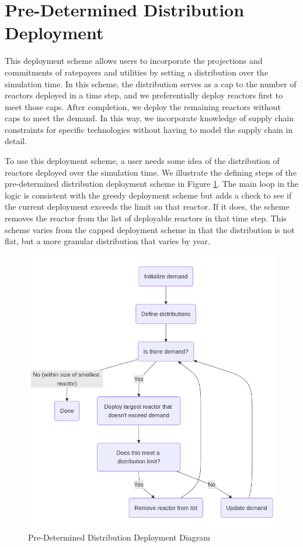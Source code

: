 \section{Pre-Determined Distribution Deployment}
\label{sec:pre_determined_distribution_deployment}
This deployment scheme allows users to incorporate the projections and
commitments of ratepayers and utilities by setting a distribution over the
simulation time. In this scheme, the distribution serves as a cap to the
number of reactors deployed in a time step, and we preferentially
deploy reactors first to meet those caps. After completion, we deploy the
remaining reactors without caps to meet the demand. In this way, we incorporate
knowledge of supply chain constraints for specific technologies without having
to model the supply chain in detail.

To use this deployment scheme, a user needs some idea of the distribution of
reactors deployed over the simulation time. We illustrate the defining steps of
the pre-determined distribution deployment scheme in Figure
\ref{fig:pre_det_diagram}. The main loop in the logic is consistent with the
greedy deployment scheme but adds a check to see if the current deployment
exceeds the limit on that reactor. If it does, the scheme removes the reactor
from the list of deployable reactors in that time step. This scheme varies from
the capped deployment scheme in that the distribution is not flat, but a more
granular distribution that varies by year.

\begin{figure}[!hp]
    \centering
    \includegraphics[scale=0.4]{images/schemes/pre_det_diagram.png}
    \caption{Pre-Determined Distribution Deployment Diagram}
    \label{fig:pre_det_diagram}
\end{figure}


